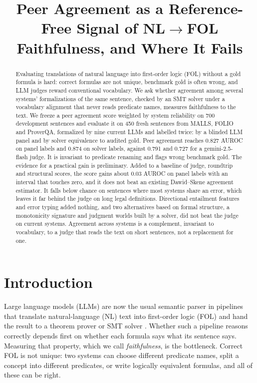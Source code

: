 \documentclass[11pt,letterpaper]{article}
\title{\vspace{-1.5cm}Peer Agreement as a Reference-Free Signal of NL$\rightarrow$FOL Faithfulness, and Where It Fails}
\author{\vspace{-1cm}}
\date{\vspace{-1cm}}
\begin{document}
\maketitle

\begin{abstract}
Evaluating translations of natural language into first-order logic (FOL) without a gold formula is hard: correct formulas are not unique, benchmark gold is often wrong, and LLM judges reward conventional vocabulary. We ask whether agreement among several systems' formalizations of the same sentence, checked by an SMT solver under a vocabulary alignment that never reads predicate names, measures faithfulness to the text. We freeze a peer agreement score weighted by system reliability on 700 development sentences and evaluate it on 450 fresh sentences from MALLS, FOLIO and ProverQA, formalized by nine current LLMs and labelled twice: by a blinded LLM panel and by solver equivalence to audited gold. Peer agreement reaches 0.827 AUROC on panel labels and 0.874 on solver labels, against 0.791 and 0.727 for a gemini-2.5-flash judge. It is invariant to predicate renaming and flags wrong benchmark gold. The evidence for a practical gain is preliminary. Added to a baseline of judge, roundtrip and structural scores, the score gains about 0.03 AUROC on panel labels with an interval that touches zero, and it does not beat an existing Dawid--Skene agreement estimator. It falls below chance on sentences where most systems share an error, which leaves it far behind the judge on long legal definitions. Directional entailment features and error typing added nothing, and two alternatives based on formal structure, a monotonicity signature and judgment worlds built by a solver, did not beat the judge on current systems. Agreement across systems is a complement, invariant to vocabulary, to a judge that reads the text on short sentences, not a replacement for one.
\end{abstract}

\section{Introduction}
\label{sec:intro}

Large language models (LLMs) are now the usual semantic parser in pipelines that translate natural-language (NL) text into first-order logic (FOL) and hand the result to a theorem prover or SMT solver \citep{Pan2023,Olausson2023}. Whether such a pipeline reasons correctly depends first on whether each formula says what its sentence says. Measuring that property, which we call \emph{faithfulness}, is the bottleneck. Correct FOL is not unique: two systems can choose different predicate names, split a concept into different predicates, or write logically equivalent formulas, and all of these can be right.
\end{document}
